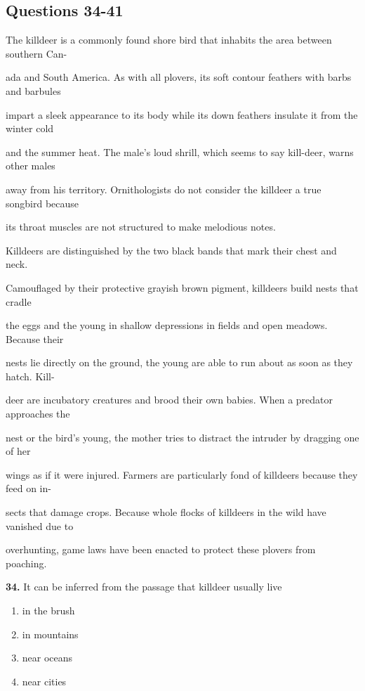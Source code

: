 \documentclass[12pt]{article}
\begin{document}
\subsection*{Questions 34-41}
\begingroup
\small
\sloppy
\setlength{\parskip}{0pt}
\setlength{\parindent}{0pt}
The killdeer is a commonly found shore bird that inhabits the area between southern Can-\par
ada and South America. As with all plovers, its soft contour feathers with barbs and barbules\par
impart a sleek appearance to its body while its down feathers insulate it from the winter cold\par
and the summer heat. The male's loud shrill, which seems to say kill-deer, warns other males\par
away from his territory. Ornithologists do not consider the killdeer a true songbird because\par
its throat muscles are not structured to make melodious notes.\par
Killdeers are distinguished by the two black bands that mark their chest and neck.\par
Camouflaged by their protective grayish brown pigment, killdeers build nests that cradle\par
the eggs and the young in shallow depressions in fields and open meadows. Because their\par
nests lie directly on the ground, the young are able to run about as soon as they hatch. Kill-\par
deer are incubatory creatures and brood their own babies. When a predator approaches the\par
nest or the bird's young, the mother tries to distract the intruder by dragging one of her\par
wings as if it were injured. Farmers are particularly fond of killdeers because they feed on in-\par
sects that damage crops. Because whole flocks of killdeers in the wild have vanished due to\par
 overhunting, game laws have been enacted to protect these plovers from poaching.\par
\endgroup
\medskip
\noindent\textbf{34.} It can be inferred from the passage that killdeer usually live
\begin{enumerate}[label=(\Alph*),leftmargin=*,itemsep=0.2em]
\item in the brush
\item in mountains
\item near oceans
\item near cities
\end{enumerate}
\end{document}
